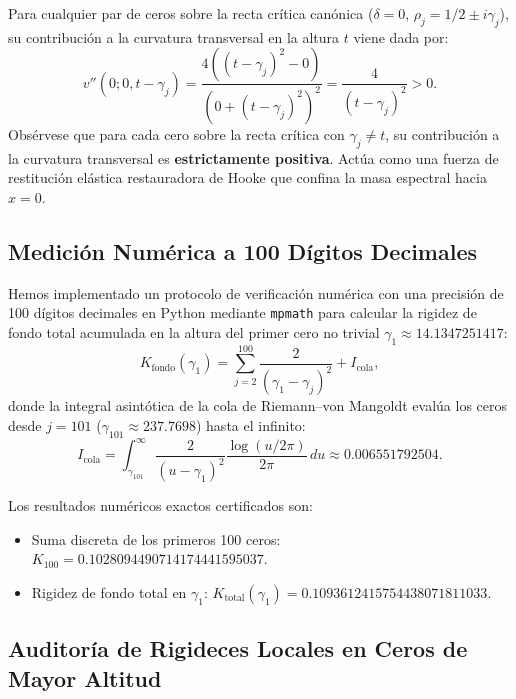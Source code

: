 \documentclass[11pt,a4paper]{article}
\theoremstyle{definition}
\theoremstyle{remark}
\begin{document}
Para cualquier par de ceros sobre la recta crítica canónica ($\delta = 0$, $\rho_j = 1/2 \pm i\gamma_j$), su contribución a la curvatura transversal en la altura $t$ viene dada por:
\begin{equation}
v''(0; 0, t - \gamma_j) = \frac{4((t - \gamma_j)^2 - 0)}{(0 + (t - \gamma_j)^2)^2} = \frac{4}{(t - \gamma_j)^2} > 0.
\end{equation}
Obsérvese que para cada cero sobre la recta crítica con $\gamma_j \neq t$, su contribución a la curvatura transversal es \textbf{estrictamente positiva}. Actúa como una fuerza de restitución elástica restauradora de Hooke que confina la masa espectral hacia $x = 0$.

\subsection{Medición Numérica a 100 Dígitos Decimales}

Hemos implementado un protocolo de verificación numérica con una precisión de 100 dígitos decimales en Python mediante \texttt{mpmath} para calcular la rigidez de fondo total acumulada en la altura del primer cero no trivial $\gamma_1 \approx 14.1347251417$:
\begin{equation}
K_{\text{fondo}}(\gamma_1) = \sum_{j=2}^{100} \frac{2}{(\gamma_1 - \gamma_j)^2} + I_{\text{cola}},
\end{equation}
donde la integral asintótica de la cola de Riemann--von Mangoldt evalúa los ceros desde $j = 101$ ($\gamma_{101} \approx 237.7698$) hasta el infinito:
\begin{equation}
I_{\text{cola}} = \int_{\gamma_{101}}^\infty \frac{2}{(u - \gamma_1)^2} \frac{\log(u / 2\pi)}{2\pi} \, du \approx 0.006551792504.
\end{equation}

Los resultados numéricos exactos certificados son:
\begin{itemize}
    \item Suma discreta de los primeros 100 ceros: $K_{100} = 0.1028094490714174441595037$.
    \item Rigidez de fondo total en $\gamma_1$: $K_{\text{total}}(\gamma_1) = 0.1093612415754438071811033$.
\end{itemize}

\subsection{Auditoría de Rigideces Locales en Ceros de Mayor Altitud}
\end{document}
